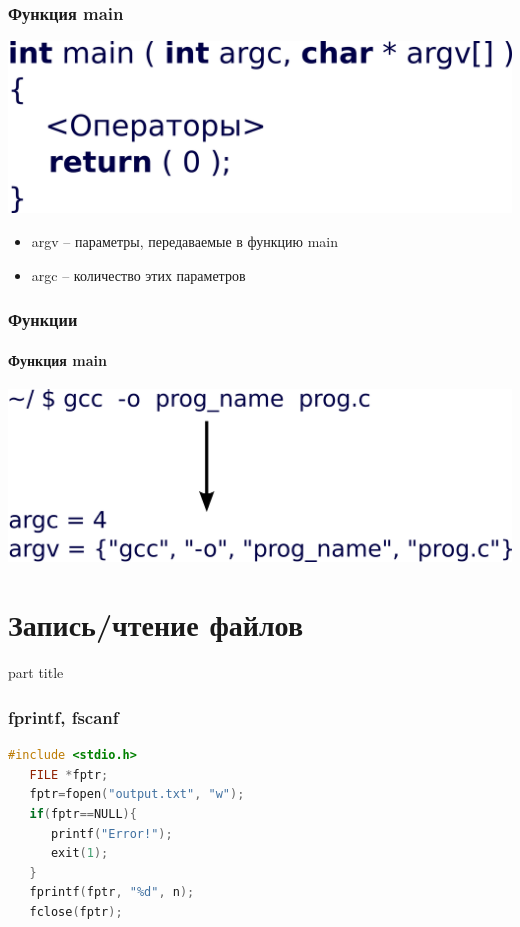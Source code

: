 \documentclass[14pt,pdf,hyperref={unicode}]{beamer}
\begin{document}
\begin{frame}[fragile]
\frametitle{Функция main}  
\begin{center}
\includegraphics[width=0.7\linewidth]{images/function_syntax_main_args.png}
\end{center}
\begin{itemize}
\item argv -- параметры, передаваемые в функцию main
\item argc -- количество этих параметров
\end{itemize}
\end{frame}

\begin{frame}[fragile]
\frametitle{Функции} 
\framesubtitle{Функция main}
\begin{center}
\includegraphics[width=1.0\linewidth]{images/function_argcargv.png}
\end{center}
\end{frame}




\section{Запись/чтение файлов}
\begin{frame}
\begin{center}
\begin{beamercolorbox}[sep=8pt,center]{part
title}
\insertsection
\end{beamercolorbox}
\end{center}
\end{frame}


\begin{frame}[fragile]
\frametitle{fprintf, fscanf}  
\begin{lstlisting}[language=C++,basicstyle=\ttfamily,keywordstyle=\color{blue},
                stringstyle=\color{orange}\ttfamily]
   #include <stdio.h>
   FILE *fptr;
   fptr=fopen("output.txt", "w");
   if(fptr==NULL){
      printf("Error!");   
      exit(1);             
   }
   fprintf(fptr, "%d", n);   
   fclose(fptr);
\end{lstlisting}
\end{frame}
\end{document}
